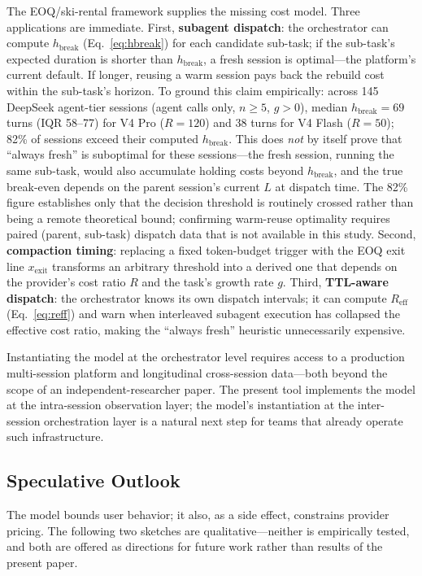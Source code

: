 \documentclass[11pt]{article}
\theoremstyle{definition}
\theoremstyle{remark}
\begin{document}
The EOQ/ski-rental framework supplies the missing cost model. Three applications are immediate. First, \textbf{subagent dispatch}: the orchestrator can compute $h_{\text{break}}$ (Eq.~\ref{eq:hbreak}) for each candidate sub-task; if the sub-task's expected duration is shorter than $h_{\text{break}}$, a fresh session is optimal---the platform's current default. If longer, reusing a warm session pays back the rebuild cost within the sub-task's horizon. To ground this claim empirically: across 145 DeepSeek agent-tier sessions (agent calls only, $n \ge 5$, $g > 0$), median $h_{\text{break}} = 69$ turns (IQR 58--77) for V4 Pro ($R = 120$) and 38 turns for V4 Flash ($R = 50$); 82\% of sessions exceed their computed $h_{\text{break}}$. This does \emph{not} by itself prove that ``always fresh'' is suboptimal for these sessions---the fresh session, running the same sub-task, would also accumulate holding costs beyond $h_{\text{break}}$, and the true break-even depends on the parent session's current $L$ at dispatch time. The 82\% figure establishes only that the decision threshold is routinely crossed rather than being a remote theoretical bound; confirming warm-reuse optimality requires paired (parent, sub-task) dispatch data that is not available in this study. Second, \textbf{compaction timing}: replacing a fixed token-budget trigger with the EOQ exit line $x_{\text{exit}}$ transforms an arbitrary threshold into a derived one that depends on the provider's cost ratio $R$ and the task's growth rate $g$. Third, \textbf{TTL-aware dispatch}: the orchestrator knows its own dispatch intervals; it can compute $R_{\text{eff}}$ (Eq.~\ref{eq:reff}) and warn when interleaved subagent execution has collapsed the effective cost ratio, making the ``always fresh'' heuristic unnecessarily expensive.

Instantiating the model at the orchestrator level requires access to a production multi-session platform and longitudinal cross-session data---both beyond the scope of an independent-researcher paper. The present tool implements the model at the intra-session observation layer; the model's instantiation at the inter-session orchestration layer is a natural next step for teams that already operate such infrastructure.

\subsection{Speculative Outlook}

The model bounds user behavior; it also, as a side effect, constrains provider pricing. The following two sketches are qualitative---neither is empirically tested, and both are offered as directions for future work rather than results of the present paper.
\end{document}
